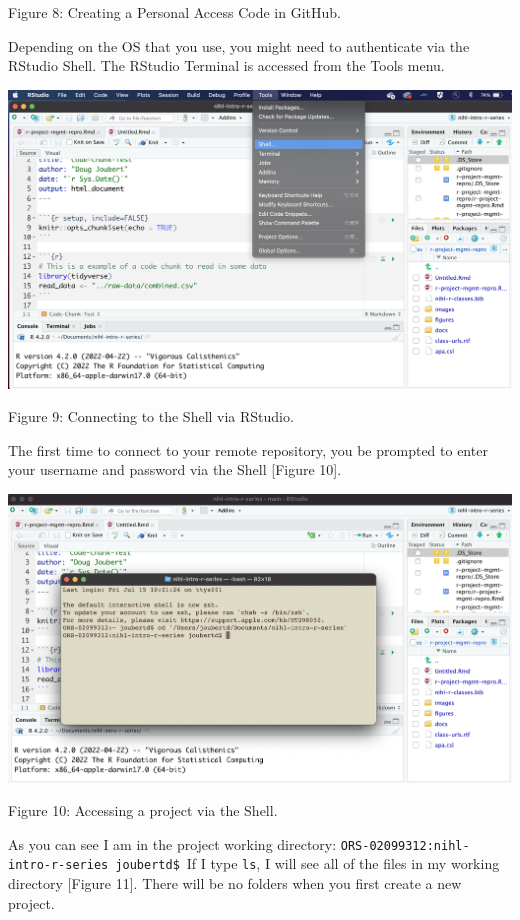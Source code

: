 \documentclass[
]{article}
\begin{document}
Figure 8: Creating a Personal Access Code in GitHub.

Depending on the OS that you use, you might need to authenticate via the
RStudio Shell. The RStudio Terminal is accessed from the Tools menu.

\includegraphics[width=6.5in,height=\textheight]{images/git-hub-06.png}

Figure 9: Connecting to the Shell via RStudio.

The first time to connect to your remote repository, you be prompted to
enter your username and password via the Shell {[}Figure 10{]}.

\includegraphics[width=6.5in,height=\textheight]{images/git-01.png}

Figure 10: Accessing a project via the Shell.

As you can see I am in the project working directory:
\texttt{ORS-02099312:nihl-intro-r-series\ joubertd\$}~If I type
\texttt{ls}, I will see all of the files in my working directory
{[}Figure 11{]}. There will be no folders when you first create a new
project.
\end{document}
